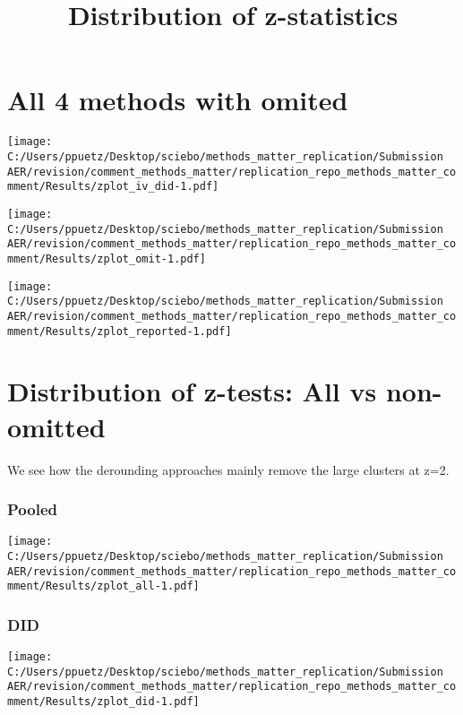 \documentclass[
]{article}
\title{Distribution of z-statistics}
\author{}
\date{\vspace{-2.5em}}
\begin{document}
\maketitle

\hypertarget{all-4-methods-with-omited}{%
\section{All 4 methods with omited}\label{all-4-methods-with-omited}}

\texttt{[image: C:/Users/ppuetz/Desktop/sciebo/methods\_matter\_replication/Submission AER/revision/comment\_methods\_matter/replication\_repo\_methods\_matter\_comment/Results/zplot\_iv\_did-1.pdf]}

\texttt{[image: C:/Users/ppuetz/Desktop/sciebo/methods\_matter\_replication/Submission AER/revision/comment\_methods\_matter/replication\_repo\_methods\_matter\_comment/Results/zplot\_omit-1.pdf]}

\texttt{[image: C:/Users/ppuetz/Desktop/sciebo/methods\_matter\_replication/Submission AER/revision/comment\_methods\_matter/replication\_repo\_methods\_matter\_comment/Results/zplot\_reported-1.pdf]}

\hypertarget{distribution-of-z-tests-all-vs-non-omitted}{%
\section{Distribution of z-tests: All vs
non-omitted}\label{distribution-of-z-tests-all-vs-non-omitted}}

We see how the derounding approaches mainly remove the large clusters at
z=2.

\hypertarget{pooled}{%
\subsubsection{Pooled}\label{pooled}}

\texttt{[image: C:/Users/ppuetz/Desktop/sciebo/methods\_matter\_replication/Submission AER/revision/comment\_methods\_matter/replication\_repo\_methods\_matter\_comment/Results/zplot\_all-1.pdf]}

\hypertarget{did}{%
\subsubsection{DID}\label{did}}

\texttt{[image: C:/Users/ppuetz/Desktop/sciebo/methods\_matter\_replication/Submission AER/revision/comment\_methods\_matter/replication\_repo\_methods\_matter\_comment/Results/zplot\_did-1.pdf]}
\end{document}
